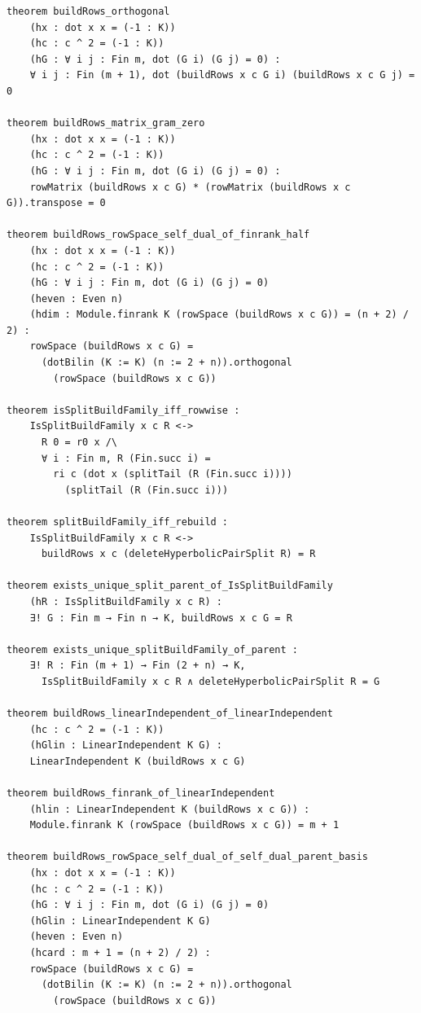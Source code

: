 \documentclass[12pt]{article}
\begin{document}
\begin{lstlisting}[caption={Lean bundle for Theorem~\ref{thm:qary-building-up}.}]
theorem buildRows_orthogonal
    (hx : dot x x = (-1 : K))
    (hc : c ^ 2 = (-1 : K))
    (hG : ∀ i j : Fin m, dot (G i) (G j) = 0) :
    ∀ i j : Fin (m + 1), dot (buildRows x c G i) (buildRows x c G j) = 0

theorem buildRows_matrix_gram_zero
    (hx : dot x x = (-1 : K))
    (hc : c ^ 2 = (-1 : K))
    (hG : ∀ i j : Fin m, dot (G i) (G j) = 0) :
    rowMatrix (buildRows x c G) * (rowMatrix (buildRows x c G)).transpose = 0

theorem buildRows_rowSpace_self_dual_of_finrank_half
    (hx : dot x x = (-1 : K))
    (hc : c ^ 2 = (-1 : K))
    (hG : ∀ i j : Fin m, dot (G i) (G j) = 0)
    (heven : Even n)
    (hdim : Module.finrank K (rowSpace (buildRows x c G)) = (n + 2) / 2) :
    rowSpace (buildRows x c G) =
      (dotBilin (K := K) (n := 2 + n)).orthogonal
        (rowSpace (buildRows x c G))

theorem isSplitBuildFamily_iff_rowwise :
    IsSplitBuildFamily x c R <->
      R 0 = r0 x /\
      ∀ i : Fin m, R (Fin.succ i) =
        ri c (dot x (splitTail (R (Fin.succ i))))
          (splitTail (R (Fin.succ i)))

theorem splitBuildFamily_iff_rebuild :
    IsSplitBuildFamily x c R <->
      buildRows x c (deleteHyperbolicPairSplit R) = R

theorem exists_unique_split_parent_of_IsSplitBuildFamily
    (hR : IsSplitBuildFamily x c R) :
    ∃! G : Fin m → Fin n → K, buildRows x c G = R

theorem exists_unique_splitBuildFamily_of_parent :
    ∃! R : Fin (m + 1) → Fin (2 + n) → K,
      IsSplitBuildFamily x c R ∧ deleteHyperbolicPairSplit R = G

theorem buildRows_linearIndependent_of_linearIndependent
    (hc : c ^ 2 = (-1 : K))
    (hGlin : LinearIndependent K G) :
    LinearIndependent K (buildRows x c G)

theorem buildRows_finrank_of_linearIndependent
    (hlin : LinearIndependent K (buildRows x c G)) :
    Module.finrank K (rowSpace (buildRows x c G)) = m + 1

theorem buildRows_rowSpace_self_dual_of_self_dual_parent_basis
    (hx : dot x x = (-1 : K))
    (hc : c ^ 2 = (-1 : K))
    (hG : ∀ i j : Fin m, dot (G i) (G j) = 0)
    (hGlin : LinearIndependent K G)
    (heven : Even n)
    (hcard : m + 1 = (n + 2) / 2) :
    rowSpace (buildRows x c G) =
      (dotBilin (K := K) (n := 2 + n)).orthogonal
        (rowSpace (buildRows x c G))
\end{lstlisting}
\end{document}
